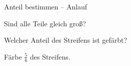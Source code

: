 \setcounter{aufgabe}{0}

\begin{aufgabe}{Anteil bestimmen – Anlauf}
\begin{teile}
\teil Sind alle Teile gleich groß? \janein

\teil Welcher Anteil des Streifens ist gefärbt?

\leerfeld
\teil Färbe $\frac{5}{6}$ des Streifens.

\end{teile}
\end{aufgabe}

